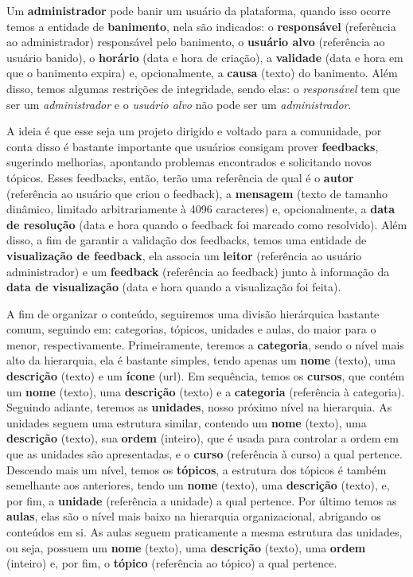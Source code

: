 
Um \textbf{administrador} pode banir um usuário da plataforma, quando isso
ocorre temos a entidade de \textbf{banimento}, nela são indicados: o
\textbf{responsável} (referência ao administrador) responsável pelo banimento,
o \textbf{usuário alvo} (referência ao usuário banido), o \textbf{horário}
(data e hora de criação), a \textbf{validade} (data e hora em que o banimento
expira) e, opcionalmente, a \textbf{causa} (texto) do banimento. Além disso,
temos algumas restrições de integridade, sendo elas: o \textit{responsável} tem
que ser um \textit{administrador} e o \textit{usuário alvo} não pode ser um
\textit{administrador}.


A ideia é que esse seja um projeto dirigido e voltado para a comunidade, por
conta disso é bastante importante que usuários consigam prover
\textbf{feedbacks}, sugerindo melhorias, apontando problemas encontrados e
solicitando novos tópicos. Esses feedbacks, então, terão uma referência de qual
é o \textbf{autor} (referência ao usuário que criou o feedback), a
\textbf{mensagem} (texto de tamanho dinâmico, limitado arbitrariamente à 4096
caracteres) e, opcionalmente, a \textbf{data de resolução} (data e hora quando
o feedback foi marcado como resolvido). Além disso, a fim de garantir a
validação dos feedbacks, temos uma entidade de \textbf{visualização de
  feedback}, ela associa um \textbf{leitor} (referência ao usuário administrador)
e um \textbf{feedback} (referência ao feedback) junto à informação da
\textbf{data de visualização} (data e hora quando a visualização foi feita).


A fim de organizar o conteúdo, seguiremos uma divisão hierárquica bastante
comum, seguindo em: categorias, tópicos, unidades e aulas, do maior para o
menor, respectivamente. Primeiramente, teremos a \textbf{categoria}, sendo o
nível mais alto da hierarquia, ela é bastante simples, tendo apenas um
\textbf{nome} (texto), uma \textbf{descrição} (texto) e um \textbf{ícone}
(url). Em sequência, temos os \textbf{cursos}, que contém um \textbf{nome}
(texto), uma \textbf{descrição} (texto) e a \textbf{categoria} (referência à
categoria). Seguindo adiante, teremos as \textbf{unidades}, nosso próximo nível
na hierarquia. As unidades seguem uma estrutura similar, contendo um
\textbf{nome} (texto), uma \textbf{descrição} (texto), sua \textbf{ordem}
(inteiro), que é usada para controlar a ordem em que as unidades são
apresentadas, e o \textbf{curso} (referência à curso) a qual pertence. Descendo
mais um nível, temos os \textbf{tópicos}, a estrutura dos tópicos é também
semelhante aos anteriores, tendo um \textbf{nome} (texto), uma
\textbf{descrição} (texto), e, por fim, a \textbf{unidade} (referência a
unidade) a qual pertence. Por último temos as \textbf{aulas}, elas são o nível
mais baixo na hierarquia organizacional, abrigando os conteúdos em si. As aulas
seguem praticamente a mesma estrutura das unidades, ou seja, possuem um
\textbf{nome} (texto), uma \textbf{descrição} (texto), uma \textbf{ordem}
(inteiro) e, por fim, o \textbf{tópico} (referência ao tópico) a qual pertence.

